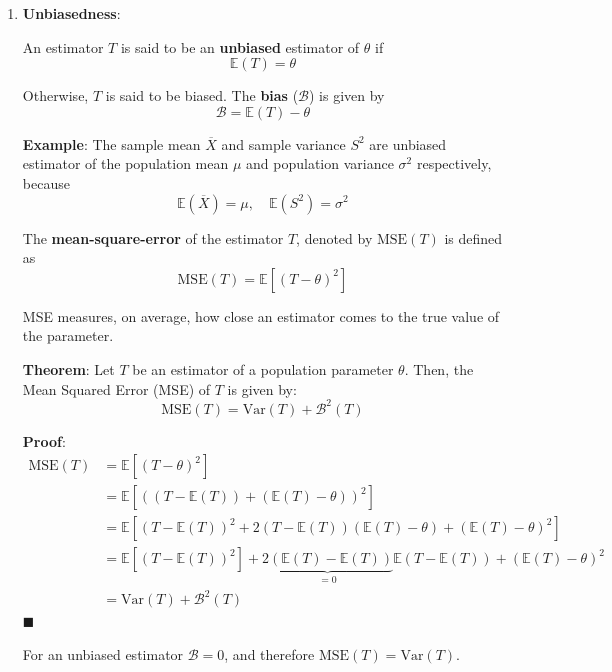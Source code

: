 \documentclass[twoside]{book}
\begin{document}
\begin{enumerate}
    \item \textbf{Unbiasedness}:
    \begin{textbox}
    An estimator \( T \) is said to be an \textbf{unbiased} estimator of $\theta$ if
    \[
        \mathbb{E}(T) = \theta
        \]
    \end{textbox}
    Otherwise, $T$ is said to be biased. The \textbf{bias} ($\mathcal{B}$) is given by
    $$\mathcal{B} = \mathbb{E}(T) - \theta$$

    \textbf{Example}: The sample mean $\overline{X}$ and sample variance $S^2$ are unbiased estimator of the population mean $\mu$ and population variance $\sigma^2$ respectively, because
    $$\mathbb{E}\left( \overline{X}\right) = \mu, \quad \mathbb{E}\left( S^2\right) = \sigma^2$$

    \begin{textbox}
    The \textbf{mean-square-error} of the estimator $T$, denoted by $\textrm{MSE}(T)$ is defined as
        $$\mathrm{MSE}(T) = \mathbb{E}\left[\left( T-\theta\right) ^2\right]$$
    \end{textbox}

    MSE measures, on average, how close an estimator comes to the true value of the parameter.

    \begin{textbox}
    \textbf{Theorem}: Let \( T \) be an estimator of a population parameter \( \theta \). Then, the {Mean Squared Error (MSE)} of \( T \) is given by:
    \[
    \mathrm{MSE}(T) = \mathrm{Var}(T) + \mathcal{B}^2(T)
    \]
    \end{textbox}
    \textbf{Proof}:
    \begin{align*}
    \mathrm{MSE}(T) &= \mathbb{E}\left[(T - \theta)^2\right] \\
    &= \mathbb{E}\left[\left((T - \mathbb{E}(T)) + (\mathbb{E}(T) - \theta)\right)^2\right] \\
    &= \mathbb{E}\left[(T - \mathbb{E}(T))^2 + 2(T - \mathbb{E}(T))(\mathbb{E}(T) - \theta) + (\mathbb{E}(T) - \theta)^2\right] \\
    &= \mathbb{E}[(T - \mathbb{E}(T))^2] + \underbrace{2(\mathbb{E}(T) - \mathbb{E}(T))}_{= 0}\mathbb{E}\left( T - \mathbb{E}(T)\right)  + (\mathbb{E}(T) - \theta)^2 \\
    &= \mathrm{Var}(T) + \mathcal{B}^2(T)
    \end{align*}
    \hfill $\blacksquare$

    For an unbiased estimator $\mathcal{B} = 0$, and therefore $\mathrm{MSE}(T) = \mathrm{Var}(T)$.


\end{enumerate}
\end{document}
